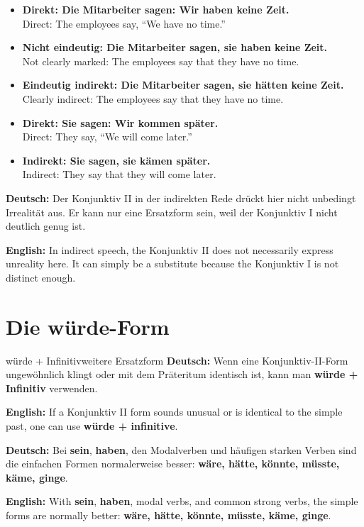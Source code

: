 \documentclass[a4paper,11pt]{article}
\newcommand{\GermanText}[1]{\textbf{Deutsch: }#1\par}
\newcommand{\EnglishText}[1]{{\small\color{SoftGray}\textbf{English: }#1\par}}
\newcommand{\ExampleItem}[2]{\item \textbf{#1}\\{\small\color{SoftGray}#2}}
\begin{document}
        \begin{exbox}
            \begin{itemize}
                \ExampleItem{Direkt: Die Mitarbeiter sagen: \glqq Wir haben keine Zeit.\grqq}{Direct: The employees say, ``We have no time.''}
                \ExampleItem{Nicht eindeutig: Die Mitarbeiter sagen, sie haben keine Zeit.}{Not clearly marked: The employees say that they have no time.}
                \ExampleItem{Eindeutig indirekt: Die Mitarbeiter sagen, sie hätten keine Zeit.}{Clearly indirect: The employees say that they have no time.}
                \ExampleItem{Direkt: Sie sagen: \glqq Wir kommen später.\grqq}{Direct: They say, ``We will come later.''}
                \ExampleItem{Indirekt: Sie sagen, sie kämen später.}{Indirect: They say that they will come later.}
            \end{itemize}
        \end{exbox}

        \begin{warningbox}
            \GermanText{Der Konjunktiv II in der indirekten Rede drückt hier nicht unbedingt Irrealität aus. Er kann nur eine Ersatzform sein, weil der Konjunktiv I nicht deutlich genug ist.}
            \EnglishText{In indirect speech, the Konjunktiv II does not necessarily express unreality here. It can simply be a substitute because the Konjunktiv I is not distinct enough.}
        \end{warningbox}


    \section{Die \glqq würde\grqq-Form}

        \begin{grammarentry}{würde + Infinitiv}{weitere Ersatzform}
            \GermanText{Wenn eine Konjunktiv-II-Form ungewöhnlich klingt oder mit dem Präteritum identisch ist, kann man \textbf{würde + Infinitiv} verwenden.}
            \EnglishText{If a Konjunktiv II form sounds unusual or is identical to the simple past, one can use \textbf{würde + infinitive}.}

            \GermanText{Bei \textbf{sein}, \textbf{haben}, den Modalverben und häufigen starken Verben sind die einfachen Formen normalerweise besser: \textbf{wäre, hätte, könnte, müsste, käme, ginge}.}
            \EnglishText{With \textbf{sein}, \textbf{haben}, modal verbs, and common strong verbs, the simple forms are normally better: \textbf{wäre, hätte, könnte, müsste, käme, ginge}.}
        \end{grammarentry}
\end{document}
